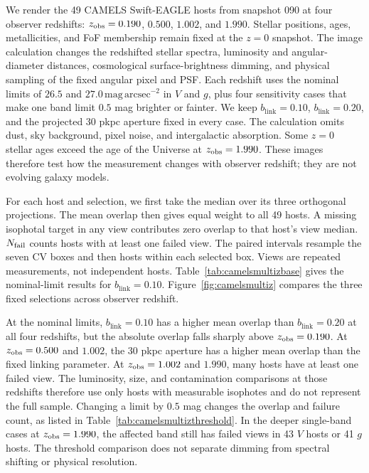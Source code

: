 \documentclass[usenatbib]{mnras}
\begin{document}
We render the 49 CAMELS Swift-EAGLE hosts from snapshot 090 at four observer
redshifts: $z_{\rm obs}=0.190$, $0.500$, $1.002$, and $1.990$. Stellar
positions, ages, metallicities, and FoF membership remain fixed at the $z=0$
snapshot. The image calculation changes the redshifted stellar spectra,
luminosity and angular-diameter distances, cosmological surface-brightness
dimming, and physical sampling of the fixed angular pixel and PSF. Each
redshift uses the nominal limits of $26.5$ and
$27.0\,\mathrm{mag\,arcsec}^{-2}$ in $V$ and $g$, plus four sensitivity
cases that make one band limit $0.5$ mag brighter or fainter. We keep
$b_{\mathrm{link}}=0.10$, $b_{\mathrm{link}}=0.20$, and the projected 30 pkpc aperture
fixed in every case. The calculation omits dust, sky background, pixel noise,
and intergalactic absorption. Some $z=0$ stellar ages exceed the age of the
Universe at $z_{\rm obs}=1.990$. These images therefore test how the
measurement changes with observer redshift; they are not evolving galaxy
models.

For each host and selection, we first take the median over its three
orthogonal projections. The mean overlap then gives equal weight to all 49
hosts. A missing isophotal target in any view contributes zero overlap to
that host's view median. $N_{\rm fail}$ counts hosts with at least one failed
view. The paired intervals resample the seven CV boxes and then hosts within
each selected box. Views are repeated measurements, not independent hosts.
Table~\ref{tab:camelsmultizbase} gives the nominal-limit results for
$b_{\mathrm{link}}=0.10$. Figure~\ref{fig:camelsmultiz} compares the three fixed
selections across observer redshift.

At the nominal limits, $b_{\mathrm{link}}=0.10$ has a higher mean overlap than
$b_{\mathrm{link}}=0.20$ at all four redshifts, but the absolute overlap falls
sharply above $z_{\rm obs}=0.190$. At $z_{\rm obs}=0.500$ and $1.002$, the
30 pkpc aperture has a higher mean overlap than the fixed linking parameter.
At $z_{\rm obs}=1.002$ and $1.990$, many hosts have at least one failed view.
The luminosity, size, and contamination comparisons at those redshifts
therefore use only hosts with measurable isophotes and do not represent the
full sample. Changing a limit by $0.5$ mag changes the overlap and failure
count, as listed in Table~\ref{tab:camelsmultizthreshold}. In the deeper
single-band cases at $z_{\rm obs}=1.990$, the affected band still has failed
views in 43 $V$ hosts or 41 $g$ hosts. The threshold comparison does not
separate dimming from spectral shifting or physical resolution.
\end{document}
